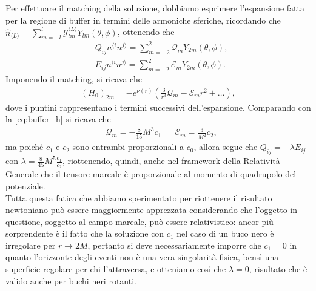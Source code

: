 Per effettuare il matching della soluzione, dobbiamo esprimere l'espansione fatta per la regione di buffer in termini delle armoniche sferiche, ricordando che $\hat{n}_{\langle L \rangle} = \sum_{m=-l}^l \mathcal{Y}_{lm}^{\langle L \rangle} Y_{lm}(\theta, \phi)$, ottenendo che
\begin{align}
	&Q_{ij} n^{\langle i} n^{j \rangle} = \sum_{m=-2}^2 \mathcal{Q}_m Y_{2m}(\theta,\phi), \\
	&E_{ij} n^{\langle i} n^{j \rangle} = \sum_{m=-2}^2 \mathcal{E}_m Y_{2m}(\theta, \phi).
\end{align}
Imponendo il matching, si ricava che
\begin{align}
	(H_0)_{2m} = -e^{\nu(r)}\left( \frac{3}{r^3} \mathcal{Q}_m - \mathcal{E}_m r^2 + \ldots \right),
\end{align}
dove i puntini rappresentano i termini successivi dell'espansione. Comparando con la \eqref{eq:buffer_h} si ricava che
\begin{align}
	&\mathcal{Q}_m = - \frac{8}{15} M^3 c_1 & &\mathcal{E}_m = \frac{3}{M^2}c_2,
\end{align}
ma poiché $c_1$ e $c_2$ sono entrambi proporzionali a $c_0$, allora segue che $Q_{ij} = -\lambda E_{ij}$ con $\lambda = \frac{8}{45}M^5 \frac{c_1}{c_2}$, riottenendo, quindi, anche nel framework della Relatività Generale che il tensore mareale è proporzionale al momento di quadrupolo del potenziale. \\
Tutta questa fatica che abbiamo sperimentato per riottenere il risultato newtoniano può essere maggiormente apprezzata considerando che l'oggetto in questione, soggetto al campo mareale, può essere relativistico: ancor più sorprendente è il fatto che la soluzione con $c_1$ nel caso di un buco nero è irregolare per $r \to 2M$, pertanto si deve necessariamente imporre che $c_1=0$ in quanto l'orizzonte degli eventi non è una vera singolarità fisica, bensì una superficie regolare per chi l'attraversa, e otteniamo così che $\lambda = 0$, risultato che è valido anche per buchi neri rotanti.
